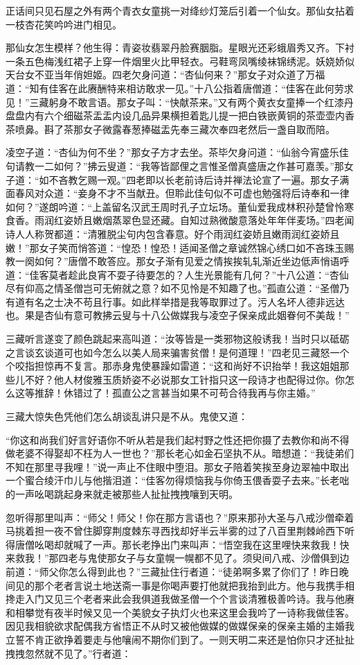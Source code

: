 \documentclass[12pt,UTF8]{ctexbook}
\begin{document}
正话间只见石屋之外有两个青衣女童挑一对绛纱灯笼后引着一个仙女。那仙女拈着一枝杏花笑吟吟进门相见。

那仙女怎生模样？他生得：青姿妆翡翠丹脸赛胭脂。星眼光还彩蛾眉秀又齐。下衬一条五色梅浅红裙子上穿一件烟里火比甲轻衣。弓鞋弯凤嘴绫袜锦绣泥。妖娆娇似天台女不亚当年俏妲姬。四老欠身问道：“杏仙何来？”那女子对众道了万福道：“知有佳客在此赓酬特来相访敢求一见。”十八公指着唐僧道：“佳客在此何劳求见！”三藏躬身不敢言语。那女子叫：“快献茶来。”又有两个黄衣女童捧一个红漆丹盘盘内有六个细磁茶盂盂内设几品异果横担着匙儿提一把白铁嵌黄铜的茶壶壶内香茶喷鼻。斟了茶那女子微露春葱捧磁盂先奉三藏次奉四老然后一盏自取而陪。

凌空子道：“杏仙为何不坐？”那女子方才去坐。茶毕欠身问道：“仙翁今宵盛乐佳句请教一二如何？”拂云叟道：“我等皆鄙俚之言惟圣僧真盛唐之作甚可嘉羡。”那女子道：“如不吝教乞赐一观。”四老即以长老前诗后诗并禅法论宣了一遍。那女子满面春风对众道：“妾身不才不当献丑。但聆此佳句似不可虚也勉强将后诗奉和一律如何？”遂朗吟道：“上盖留名汉武王周时孔子立坛场。董仙爱我成林积孙楚曾怜寒食香。雨润红姿娇且嫩烟蒸翠色显还藏。自知过熟微酸意落处年年伴麦场。”四老闻诗人人称贺都道：“清雅脱尘句内包含春意。好个雨润红姿娇且嫩雨润红姿娇且嫩！”那女子笑而悄答道：“惶恐！惶恐！适闻圣僧之章诚然锦心绣口如不吝珠玉赐教一阕如何？”唐僧不敢答应。那女子渐有见爱之情挨挨轧轧渐近坐边低声悄语呼道：“佳客莫者趁此良宵不耍子待要怎的？人生光景能有几何？”十八公道：“杏仙尽有仰高之情圣僧岂可无俯就之意？如不见怜是不知趣了也。”孤直公道：“圣僧乃有道有名之士决不苟且行事。如此样举措是我等取罪过了。污人名坏人德非远达也。果是杏仙有意可教拂云叟与十八公做媒我与凌空子保亲成此姻眷何不美哉！”

三藏听言遂变了颜色跳起来高叫道：“汝等皆是一类邪物这般诱我！当时只以砥砺之言谈玄谈道可也如今怎么以美人局来骗害贫僧！是何道理！”四老见三藏怒一个个咬指担惊再不复言。那赤身鬼使暴躁如雷道：“这和尚好不识抬举！我这姐姐那些儿不好？他人材俊雅玉质娇姿不必说那女工针指只这一段诗才也配得过你。你怎么这等推辞！休错过了！孤直公之言甚当如果不可苟合待我再与你主婚。”

三藏大惊失色凭他们怎么胡谈乱讲只是不从。鬼使又道：

“你这和尚我们好言好语你不听从若是我们起村野之性还把你摄了去教你和尚不得做老婆不得娶却不枉为人一世也？”那长老心如金石坚执不从。暗想道：“我徒弟们不知在那里寻我哩！”说一声止不住眼中堕泪。那女子陪着笑挨至身边翠袖中取出一个蜜合绫汗巾儿与他揩泪道：“佳客勿得烦恼我与你倚玉偎香耍子去来。”长老咄的一声吆喝跳起身来就走被那些人扯扯拽拽嚷到天明。

忽听得那里叫声：“师父！师父！你在那方言语也？”原来那孙大圣与八戒沙僧牵着马挑着担一夜不曾住脚穿荆度棘东寻西找却好半云半雾的过了八百里荆棘岭西下听得唐僧吆喝却就喊了一声。那长老挣出门来叫声：“悟空我在这里哩快来救我！快来救我！”那四老与鬼使那女子与女童幌一幌都不见了。须臾间八戒、沙僧俱到边前道：“师父你怎么得到此也？”三藏扯住行者道：“徒弟啊多累了你们了！昨日晚间见的那个老者言说土地送斋一事是你喝声要打他就把我抬到此方。他与我携手相搀走入门又见三个老者来此会我俱道我做圣僧一个个言谈清雅极善吟诗。我与他赓和相攀觉有夜半时候又见一个美貌女子执灯火也来这里会我吟了一诗称我做佳客。因见我相貌欲求配偶我方省悟正不从时又被他做媒的做媒保亲的保亲主婚的主婚我立誓不肯正欲挣着要走与他嚷闹不期你们到了。一则天明二来还是怕你只才还扯扯拽拽忽然就不见了。”行者道：
\end{document}
